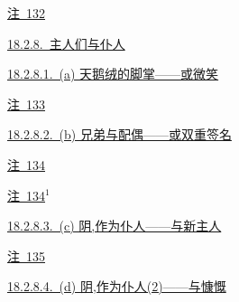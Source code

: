 \par\noindent\hspace*{4.05em}\hyperref[ch18:local:n38]{注~132}\nobreak\dotfill\nobreak\hyperref[ch18:local:n38]{\pageref*{ch18:local:n38}}\par
\par\noindent\hspace*{1.35em}\hyperref[ch18:local:h43]{18.2.8.~主人们与仆人}\nobreak\dotfill\nobreak\hyperref[ch18:local:h43]{\pageref*{ch18:local:h43}}\par
\par\noindent\hspace*{2.70em}\hyperref[ch18:local:h44]{18.2.8.1.~(a) 天鹅绒的脚掌——或微笑}\nobreak\dotfill\nobreak\hyperref[ch18:local:h44]{\pageref*{ch18:local:h44}}\par
\par\noindent\hspace*{4.05em}\hyperref[ch18:local:n39]{注~133}\nobreak\dotfill\nobreak\hyperref[ch18:local:n39]{\pageref*{ch18:local:n39}}\par
\par\noindent\hspace*{2.70em}\hyperref[ch18:local:h45]{18.2.8.2.~(b) 兄弟与配偶——或双重签名}\nobreak\dotfill\nobreak\hyperref[ch18:local:h45]{\pageref*{ch18:local:h45}}\par
\par\noindent\hspace*{4.05em}\hyperref[ch18:local:n40]{注~134}\nobreak\dotfill\nobreak\hyperref[ch18:local:n40]{\pageref*{ch18:local:n40}}\par
\par\noindent\hspace*{4.05em}\hyperref[ch18:local:n41]{注~134$^1$}\nobreak\dotfill\nobreak\hyperref[ch18:local:n41]{\pageref*{ch18:local:n41}}\par
\par\noindent\hspace*{2.70em}\hyperref[ch18:local:h46]{18.2.8.3.~(c) 阴,作为仆人——与新主人}\nobreak\dotfill\nobreak\hyperref[ch18:local:h46]{\pageref*{ch18:local:h46}}\par
\par\noindent\hspace*{4.05em}\hyperref[ch18:local:n42]{注~135}\nobreak\dotfill\nobreak\hyperref[ch18:local:n42]{\pageref*{ch18:local:n42}}\par
\par\noindent\hspace*{2.70em}\hyperref[ch18:local:h47]{18.2.8.4.~(d) 阴,作为仆人(2)——与慷慨}\nobreak\dotfill\nobreak\hyperref[ch18:local:h47]{\pageref*{ch18:local:h47}}\par
